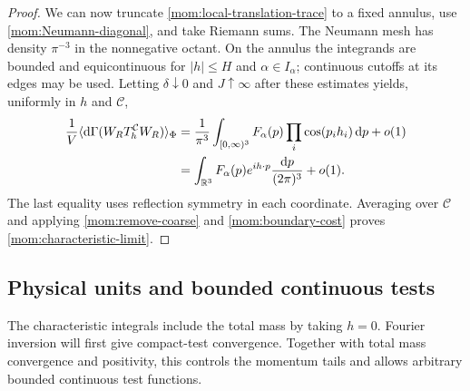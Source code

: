\begin{proof}
We can now truncate \eqref{mom:local-translation-trace} to a fixed
annulus, use \eqref{mom:Neumann-diagonal}, and take Riemann sums.
The Neumann mesh has density $\pi^{-3}$ in the nonnegative octant.
On the annulus the integrands are bounded and equicontinuous for
$|h|\le H$ and $\alpha\in I_\alpha$; continuous cutoffs at its edges
may be used. Letting $\delta\downarrow0$ and $J\uparrow\infty$ after
these estimates yields, uniformly in $h$ and $\mathcal C$,
\begin{align}
 \frac1V\langle\mathrm d\Gamma(W_RT_h^{\mathcal C}W_R)\rangle_\Phi
 &=\frac1{\pi^3}\int_{[0,\infty)^3}
       F_\alpha(p)\prod_i\cos(p_i h_i)\,\mathrm d p+o(1)\notag\\
 &=\int_{\mathbb R^3}F_\alpha(p)e^{ih\cdot p}
                          \frac{\mathrm d p}{(2\pi)^3}+o(1).
 \label{mom:octant-Fourier}
\end{align}
The last equality uses reflection symmetry in each coordinate.
Averaging over $\mathcal C$ and applying
\eqref{mom:remove-coarse} and \eqref{mom:boundary-cost} proves
\eqref{mom:characteristic-limit}.
\end{proof}

\subsection{Physical units and bounded continuous tests}

The characteristic integrals include the total mass by taking $h=0$.
Fourier inversion will first give compact-test convergence. Together
with total mass convergence and positivity, this controls the momentum
tails and allows arbitrary bounded continuous test functions.

